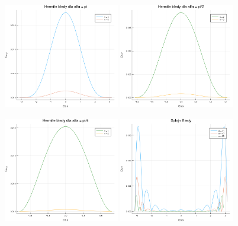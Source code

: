 \documentclass[paper=a4, fontsize=11pt]{scrartcl} %
\numberwithin{equation}{section} %
\numberwithin{figure}{section} %
\numberwithin{table}{section} %
\begin{document}
\begin{figure}
\centering
{\label{hermite}
\includegraphics[width=0.45\textwidth]{hermitebledy}}
\quad
{\label{hermite}
\includegraphics[width=0.45\textwidth]{hermitedwabledy}}
\end{figure}
\begin{figure}
\centering
{\label{hermite}
\includegraphics[width=0.45\textwidth]{hermitetrzybledy}}
\quad
{\label{hermite}
\includegraphics[width=0.45\textwidth]{splajnbledy}}
\end{figure}
\end{document}
